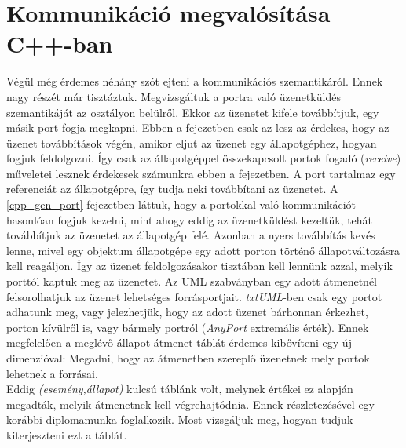 \documentclass[a4paper,12pt]{report}
\begin{document}
\section{Kommunikáció megvalósítása C++-ban} \label{comm}
Végül még érdemes néhány szót ejteni a kommunikációs szemantikáról. Ennek nagy részét már tisztáztuk. Megvizsgáltuk a portra való üzenetküldés szemantikáját az osztályon belülről. Ekkor az üzenetet kifele továbbítjuk, egy másik port fogja megkapni. Ebben a fejezetben csak az lesz az érdekes, hogy az üzenet továbbítások végén, amikor eljut az üzenet egy állapotgéphez, hogyan fogjuk feldolgozni. Így csak az állapotgéppel összekapcsolt portok fogadó (\textit{receive}) műveletei lesznek érdekesek számunkra ebben a fejezetben. A port tartalmaz egy referenciát az állapotgépre, így tudja neki továbbítani az üzenetet. A \ref{cpp_gen_port} fejezetben láttuk, hogy a portokkal való kommunikációt hasonlóan fogjuk kezelni, mint ahogy eddig az üzenetküldést kezeltük, tehát továbbítjuk az üzenetet az állapotgép felé. Azonban a nyers továbbítás kevés lenne, mivel egy objektum állapotgépe egy adott porton történő állapotváltozásra kell reagáljon. Így az üzenet feldolgozásakor tisztában kell lennünk azzal, melyik porttól kaptuk meg az üzenetet. Az UML szabványban egy adott átmenetnél felsorolhatjuk az üzenet lehetséges forrásportjait. \textit{txtUML}-ben csak egy portot adhatunk meg, vagy jelezhetjük, hogy az adott üzenet bárhonnan érkezhet, porton kívülről is, vagy bármely portról  (\textit{AnyPort} extremális érték). Ennek megfelelően a meglévő állapot-átmenet táblát érdemes kibővíteni egy új dimenzióval: Megadni, hogy az átmenetben szereplő üzenetnek mely portok lehetnek a forrásai. \\
Eddig \textit{(esemény,állapot)} kulcsú táblánk volt, melynek értékei ez alapján megadták, melyik átmenetnek kell végrehajtódnia. Ennek részletezésével egy korábbi diplomamunka foglalkozik\cite{hack_dip}. Most vizsgáljuk meg, hogyan tudjuk kiterjeszteni ezt a táblát.
\end{document}
